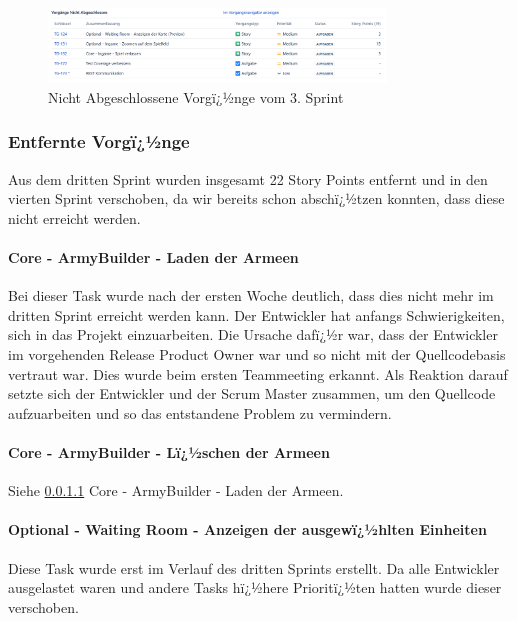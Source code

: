 \documentclass[12pt, titlepage]{scrartcl}
\begin{document}
				\begin{figure}[H] 
					\centering
					\includegraphics[width=0.8\textwidth]{Nicht_Abgeschlossene_Vorgaenge_Sprint_3.PNG}
					\caption{Nicht Abgeschlossene Vorgï¿½nge vom 3. Sprint}
					\label{NichtAbgeschlosseneVorgaengeSprint3}
				\end{figure}
		\subsubsection{Entfernte Vorgï¿½nge}
		Aus dem dritten Sprint wurden insgesamt 22 Story Points entfernt und in den vierten Sprint verschoben, da wir bereits schon abschï¿½tzen konnten, dass diese nicht erreicht werden. 
			
			\paragraph{Core - ArmyBuilder - Laden der Armeen} \label{ProblemOne}Bei dieser Task wurde nach der ersten Woche deutlich, dass dies nicht mehr im dritten Sprint erreicht werden kann. Der Entwickler hat anfangs Schwierigkeiten, sich in das Projekt einzuarbeiten. Die Ursache dafï¿½r war, dass der Entwickler im vorgehenden Release Product Owner war und so nicht mit der Quellcodebasis vertraut war. Dies wurde beim ersten Teammeeting erkannt. Als Reaktion darauf setzte sich der Entwickler und der Scrum Master zusammen, um den Quellcode aufzuarbeiten und so das entstandene Problem zu vermindern.
			
			\paragraph{Core - ArmyBuilder - Lï¿½schen der Armeen} Siehe \ref{ProblemOne} Core - ArmyBuilder - Laden der Armeen.
			
			\paragraph{Optional - Waiting Room - Anzeigen der ausgewï¿½hlten Einheiten} Diese Task wurde erst im Verlauf des dritten Sprints erstellt. Da alle Entwickler ausgelastet waren und andere Tasks hï¿½here Prioritï¿½ten hatten wurde dieser verschoben.
			
\end{document}
